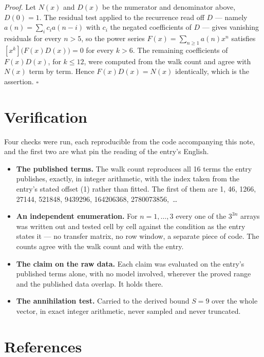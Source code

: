 \documentclass[11pt]{article}
\theoremstyle{definition}
\begin{document}
{\itshape Proof.} Let $N(x)$ and $D(x)$ be the numerator and denominator above, $D(0)=1$. The residual test applied to the recurrence read off $D$ --- namely $a(n) = \sum_i c_i a(n-i)$ with $c_i$ the negated coefficients of $D$ --- gives vanishing residuals for every $n > 5$, so the power series $F(x)=\sum_{n\ge 1}a(n)x^n$ satisfies $[x^k]\bigl(F(x)D(x)\bigr) = 0$ for every $k > 6$. The remaining coefficients of $F(x)D(x)$, for $k \le 12$, were computed from the walk count and agree with $N(x)$ term by term. Hence $F(x)D(x) = N(x)$ identically, which is the assertion. $\square$

\section{Verification}

Four checks were run, each reproducible from the code accompanying this note, and the first two are what pin the reading of the entry's English.

\begin{itemize}

\item {\bfseries The published terms.} The walk count reproduces all 16 terms the entry publishes, exactly, in integer arithmetic, with the index taken from the entry's stated offset (1) rather than fitted. The first of them are 1, 46, 1266, 27144, 521848, 9439296, 164206368, 2780073856,~\dots

\item {\bfseries An independent enumeration.} For $n = 1,\dots,3$ every one of the $3^{3n}$ arrays was written out and tested cell by cell against the condition as the entry states it --- no transfer matrix, no row window, a separate piece of code. The counts agree with the walk count and with the entry.

\item {\bfseries The claim on the raw data.} Each claim was evaluated on the entry's published terms alone, with no model involved, wherever the proved range and the published data overlap. It holds there.

\item {\bfseries The annihilation test.} Carried to the derived bound $S = 9$ over the whole vector, in exact integer arithmetic, never sampled and never truncated.

\end{itemize}

\section{References}
\end{document}
